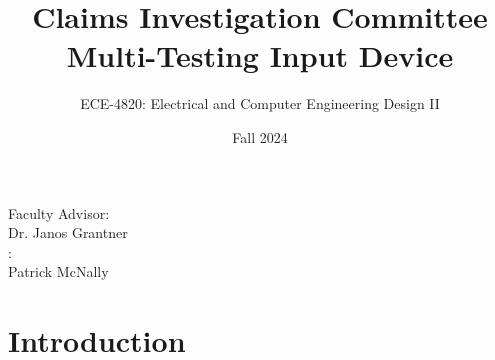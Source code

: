 \documentclass[8pt,compress,aspectratio=169]{beamer}
\title{Claims Investigation Committee Multi-Testing Input Device}
\subtitle{ECE-4820: Electrical and Computer Engineering Design II}
\author[Garza, Baker, Sah]{Dylan-Matthew Garza \and Daniel Baker \and Rohullah Sah \and}
\institute[VFU] %
{
      Department of Electrical and Computer Engineering\\
      Western Michigan University
      \and
      ZF Group\\
      Auburn Hills, MI
}
\date{Fall 2024}
\begin{document}
\begin{frame}[plain]
  \titlepage
  \small
  \begin{multicols}{2}
      Faculty Advisor:\\
      Dr. Janos Grantner\hfill\\
    \hfill{}:\\
    \hfill Patrick McNally
  \end{multicols}
\end{frame}

\section{Introduction}

\end{document}
